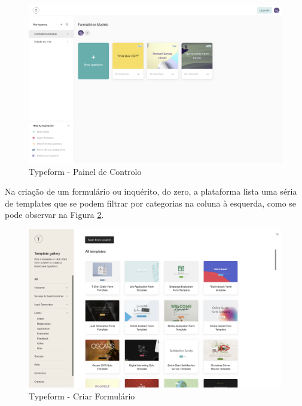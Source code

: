 \clearpage

\begin{figure}[ht!]
	\begin{center}
		\includegraphics[width=1\textwidth]{img/tf/tf-dashboard}
		\caption{Typeform - Painel de Controlo}
		\label{fig:tf-dashboard}
	\end{center}
\end{figure}

Na criação de um formulário ou inquérito, do zero, a plataforma lista uma séria de templates que se podem filtrar por categorias na coluna à esquerda, como se pode observar na Figura \ref{fig:tf-form-create}.

\begin{figure}[ht!]
	\begin{center}
		\includegraphics[width=1\textwidth]{img/tf/tf-form-create}
		\caption{Typeform - Criar Formulário}
		\label{fig:tf-form-create}
	\end{center}
\end{figure}
\newpage

